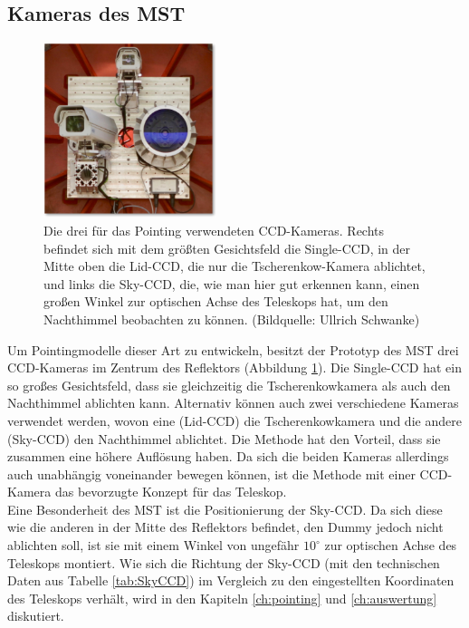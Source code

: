 \subsection{Kameras des MST}
\label{se:cameras}
\begin{figure}
\centering
\includegraphics[width=0.45\textwidth]{Images/ccd.png}
\caption{Die drei für das Pointing verwendeten CCD-Kameras. Rechts befindet sich mit dem größten Gesichtsfeld die Single-CCD, in der Mitte oben die Lid-CCD, die nur die Tscherenkow-Kamera ablichtet, und links die Sky-CCD, die, wie man hier gut erkennen kann, einen großen Winkel zur optischen Achse des Teleskops hat, um den Nachthimmel beobachten zu können. (Bildquelle: Ullrich Schwanke)}
\label{img:cameras}
\end{figure}
Um Pointingmodelle dieser Art zu entwickeln, besitzt der Prototyp des MST drei CCD-Kameras im Zentrum des Reflektors (Abbildung \ref{img:cameras}). Die Single-CCD hat ein so großes Gesichtsfeld, dass sie gleichzeitig die Tscherenkowkamera als auch den Nachthimmel ablichten kann. Alternativ können auch zwei verschiedene Kameras verwendet werden, wovon eine (Lid-CCD) die Tscherenkowkamera und die andere (Sky-CCD) den Nachthimmel ablichtet. Die Methode hat den Vorteil, dass sie zusammen eine höhere Auflösung haben. Da sich die beiden Kameras allerdings auch unabhängig voneinander bewegen können, ist die Methode mit einer CCD-Kamera das bevorzugte Konzept für das Teleskop\cite{pos}.\\
Eine Besonderheit des MST ist die Positionierung der Sky-CCD. Da sich diese wie die anderen in der Mitte des Reflektors befindet, den Dummy jedoch nicht ablichten soll, ist sie mit einem Winkel von ungefähr $10^{\circ}$ zur optischen Achse des Teleskops montiert. Wie sich die Richtung der Sky-CCD (mit den technischen Daten aus Tabelle \ref{tab:SkyCCD}) im Vergleich zu den eingestellten Koordinaten des Teleskops verhält, wird in den Kapiteln \ref{ch:pointing} und \ref{ch:auswertung} diskutiert.

